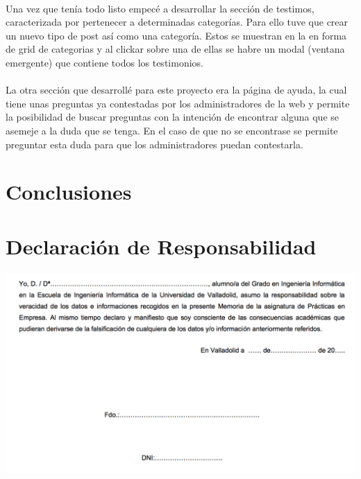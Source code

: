 \documentclass[10pt, a4paper,spanish]{article}
\begin{document}
            \paragraph{}
            Una vez que tenía todo listo empecé a desarrollar la sección de testimos, caracterizada por pertenecer a determinadas categorías. Para ello tuve que crear un nuevo tipo de post así como una categoría. Estos se muestran en la en forma de grid de categorias y al clickar sobre una de ellas se habre un modal (ventana emergente) que contiene todos los testimonios.

            \paragraph{}
            La otra sección que desarrollé para este proyecto era la página de ayuda, la cual tiene unas preguntas ya contestadas por los administradores de la web y permite la posibilidad de buscar preguntas con la intención de encontrar alguna que se asemeje a la duda que se tenga. En el caso de que no se encontrase se permite preguntar esta duda para que los administradores puedan contestarla.


    \section{Conclusiones}



    \newpage
    \section{Declaración de Responsabilidad}

        \includegraphics[width=\textwidth]{res/responsibility-declaration}
\end{document}

